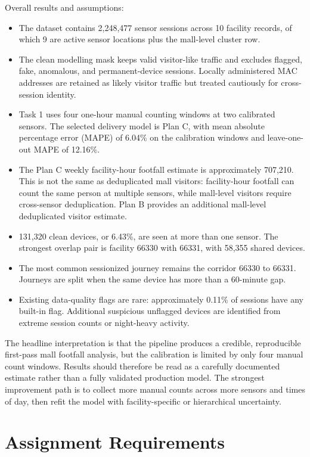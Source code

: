 \documentclass[11pt,a4paper]{article}
\begin{document}
Overall results and assumptions:
\begin{itemize}
  \item The dataset contains 2,248,477 sensor sessions across 10 facility records, of which 9 are active sensor locations plus the mall-level cluster row.
  \item The clean modelling mask keeps valid visitor-like traffic and excludes flagged, fake, anomalous, and permanent-device sessions. Locally administered MAC addresses are retained as likely visitor traffic but treated cautiously for cross-session identity.
  \item Task 1 uses four one-hour manual counting windows at two calibrated sensors. The selected delivery model is Plan C, with mean absolute percentage error (MAPE) of 6.04\% on the calibration windows and leave-one-out MAPE of 12.16\%.
  \item The Plan C weekly facility-hour footfall estimate is approximately 707,210. This is not the same as deduplicated mall visitors: facility-hour footfall can count the same person at multiple sensors, while mall-level visitors require cross-sensor deduplication. Plan B provides an additional mall-level deduplicated visitor estimate.
  \item 131,320 clean devices, or 6.43\%, are seen at more than one sensor. The strongest overlap pair is facility 66330 with 66331, with 58,355 shared devices.
  \item The most common sessionized journey remains the corridor 66330 to 66331. Journeys are split when the same device has more than a 60-minute gap.
  \item Existing data-quality flags are rare: approximately 0.11\% of sessions have any built-in flag. Additional suspicious unflagged devices are identified from extreme session counts or night-heavy activity.
\end{itemize}

The headline interpretation is that the pipeline produces a credible, reproducible first-pass mall footfall analysis, but the calibration is limited by only four manual count windows. Results should therefore be read as a carefully documented estimate rather than a fully validated production model. The strongest improvement path is to collect more manual counts across more sensors and times of day, then refit the model with facility-specific or hierarchical uncertainty.

\section{Assignment Requirements}
\end{document}
